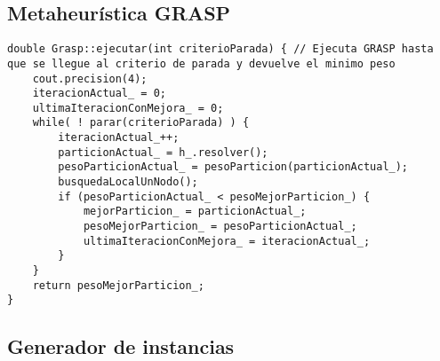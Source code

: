 \newpage

\subsection{Metaheurística GRASP}

\begin{lstlisting}[frame=single]
double Grasp::ejecutar(int criterioParada) { // Ejecuta GRASP hasta que se llegue al criterio de parada y devuelve el minimo peso
    cout.precision(4);
    iteracionActual_ = 0;
    ultimaIteracionConMejora_ = 0;
    while( ! parar(criterioParada) ) {
        iteracionActual_++;
        particionActual_ = h_.resolver();
        pesoParticionActual_ = pesoParticion(particionActual_);
        busquedaLocalUnNodo();
        if (pesoParticionActual_ < pesoMejorParticion_) {
            mejorParticion_ = particionActual_;
            pesoMejorParticion_ = pesoParticionActual_;
            ultimaIteracionConMejora_ = iteracionActual_;
        }
    }
    return pesoMejorParticion_;
}
\end{lstlisting}

\newpage

\subsection{Generador de instancias}

